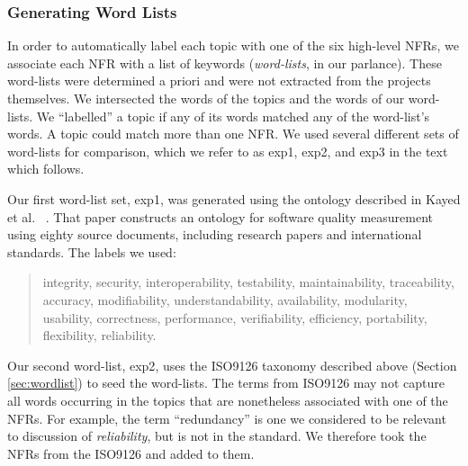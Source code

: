 \documentclass[smallextended]{svjour3}       %
\begin{document}

\subsubsection{Generating Word Lists}


In order to automatically label each topic with 
one of the six high-level NFRs,
we associate each NFR with a list
of keywords (\emph{word-lists}, in our parlance). These word-lists were determined a priori and were not extracted from the projects themselves.
We intersected the words of the topics and the words of our word-lists.
We ``labelled'' a topic if any of its words matched any of the word-list's words.
A topic could match more than one NFR.
We used several different sets of word-lists for comparison, which we
refer to as \textsf{exp1}, \textsf{exp2}, and \textsf{exp3} in the text which follows. 

Our first word-list set, \textsf{exp1}, was generated using the ontology described in Kayed et al.~\cite{5072519} .
That paper constructs an ontology for software quality measurement using eighty source documents, including research papers and international standards. 
The labels we used:

\newpage
\begin{quotation}
\small \noindent \textsf{
integrity, security,
interoperability, testability, maintainability, traceability,
accuracy, modifiability, understandability, availability, modularity,
usability, correctness, performance, verifiability, efficiency,
portability, flexibility, reliability.
}
\end{quotation}

Our second word-list, \textsf{exp2}, uses the ISO9126 taxonomy described above (Section \ref{sec:wordlist}) to seed the word-lists.
The terms from ISO9126 may not capture all words occurring in the topics that are nonetheless associated with one of the NFRs. 
For example, the term ``redundancy'' is one 
we considered to be
relevant to discussion of \emph{reliability}, but is not in the standard. 
We therefore took the NFRs from the ISO9126 and added to them.
\end{document}
